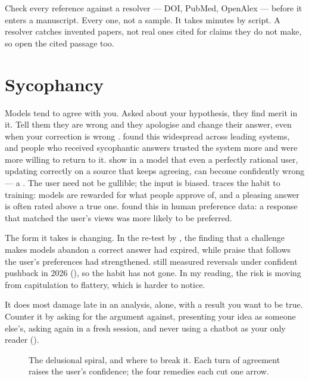 \begin{keypoint}
Check every reference against a resolver --- DOI, PubMed, OpenAlex --- before
it enters a manuscript. Every one, not a sample. It takes minutes by script.
A resolver catches invented papers, not real ones cited for claims they do not
make, so open the cited passage too.
\end{keypoint}

\section{Sycophancy}

Models tend to agree with you. Asked about your hypothesis, they find merit
in it. Tell them they are wrong and they apologise and change their answer,
even when your correction is wrong \parencite{sharma2024sycophancy}.
\textcite{cheng2026sycophancy} found this  widespread across
leading systems, and people who received sycophantic answers trusted the
system more and were more willing to return to it.
\textcite{chandra2026spiraling} show in a model that even a perfectly rational
user, updating correctly on a source that keeps agreeing, can become
confidently wrong --- a . The user need not be gullible;
the input is biased. \textcite{bengio2026lying} traces the habit to training:
models are rewarded for what people approve of, and a pleasing answer is often
rated above a true one. \textcite{sharma2024sycophancy} found this in human
preference data: a response that matched the user's views was more likely to
be preferred.

The form it takes is changing. In the re-test by \textcite{queen2026shelflife},
the finding that a challenge makes models abandon a correct answer had expired,
while praise that follows the user's preferences had strengthened. \textcite{carli2026karenina} still measured reversals under
confident pushback in 2026 (), so the habit has not gone. In
my reading, the risk is moving from capitulation to flattery, which is harder
to notice.

It does most damage late in an analysis, alone, with a result you want to be
true. Counter it by asking for the argument against, presenting your idea as
someone else's, asking again in a fresh session, and never using a chatbot as
your only reader ().

\begin{figure}[htbp]
\centering
{}
\caption{The delusional spiral, and where to break it. Each turn of agreement
raises the user's confidence; the four remedies each cut one arrow.}
\label{fig:spiral}
\end{figure}

